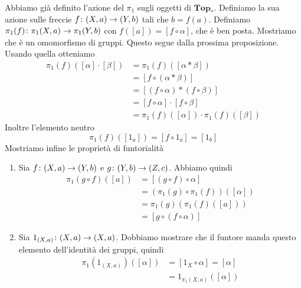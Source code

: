 \documentclass[a4paper]{article}
\begin{document}
\begin{snippetproof}{}
    Abbiamo già definito l'azione del \(\pi_1\)
    sugli oggetti di \(\mathbf{Top}_\ast\). Definiamo la sua azione sulle freccie
    \(f \colon (X, a) \to (Y, b)\) tali che \(b = f(a)\).
    Definiamo \(\pi_1(f) \colon \pi_1(X, a) \to \pi_1(Y, b)\)
    con \(f([a]) = [f \circ \alpha]\), che è ben posta.
    Mostriamo che è un omomorfismo di gruppi.
    Questo segue dalla prossima proposizione. Usando quella otteniamo
    \begin{align*}
        \pi_1(f)([\alpha]\cdot[\beta])
        &= \pi_1(f)([\alpha \ast \beta]) \\
        &= [f \circ (\alpha \ast \beta)] \\
        &= [(f \circ \alpha) \ast (f \circ \beta)] \\
        &= [f \circ \alpha] \cdot [f \circ \beta] \\
        &= \pi_1(f)([\alpha]) \cdot \pi_1(f)([\beta])
    \end{align*}
    Inoltre l'elemento neutro
    \[
        \pi_1(f)([1_a]) = [f \circ 1_a] = [1_b]
    \]
    Mostriamo infine le proprietà di funtorialità
    \begin{enumerate}
        \item Sia \(f \colon (X, a) \to (Y, b)\)
        e \(g \colon (Y, b) \to (Z, c)\).
        Abbiamo quindi \begin{align*}
            \pi_1(g \circ f)([a]) &= [(g \circ f) \circ \alpha] \\
            &= (\pi_1(g) \circ \pi_1(f))([\alpha]) \\
            &= \pi_1(g)(\pi_1(f)([a])) \\
            &= [g \circ (f \circ \alpha)]
        \end{align*}
        \item Sia \(1_{(X, a)} \colon (X, a) \to (X, a)\).
        Dobbiamo mostrare che il funtore manda questo elemento dell'identità dei gruppi,
        quindi
        \begin{align*}
            \pi_1(1_{(X, a)})([\alpha])
            &= [1_X \circ \alpha] = [\alpha] \\
            &= 1_{\pi_1(X, a)}([\alpha])
        \end{align*}
    \end{enumerate}
\end{snippetproof}

\begin{center}
\end{center}
\end{document}
